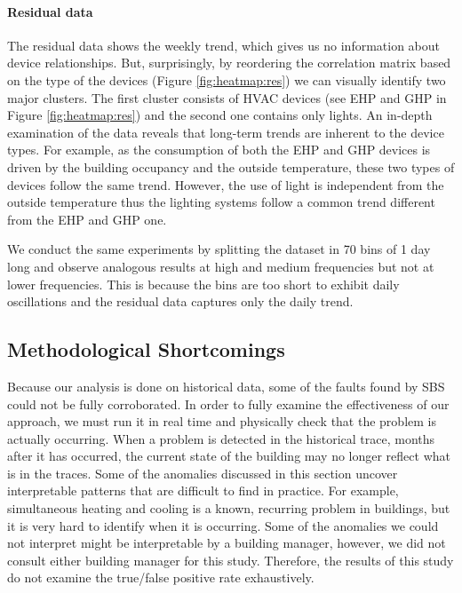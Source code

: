 \paragraph{Residual data}
The residual data shows the weekly trend, which gives us no information about device relationships.
But, surprisingly, by reordering the correlation matrix based on the type of the devices (Figure \ref{fig:heatmap:res}) 
we can visually identify two major clusters.
The first cluster consists of HVAC devices (see EHP and GHP in Figure \ref{fig:heatmap:res}) and the second one contains only lights. 
An in-depth examination of the data reveals that long-term trends are inherent to the device types. 
For example, as the consumption of both the EHP and GHP devices is driven by the building occupancy and the outside temperature, these two types of devices follow the same trend. 
However, the use of light is independent from the outside temperature thus the lighting systems follow a common trend different from the EHP and GHP one.

We conduct the same experiments by splitting the dataset in 70 bins of 1 day long and observe analogous results at high and medium frequencies but not at lower frequencies.  This is because the bins are too short to exhibit daily oscillations and the residual data captures only the daily trend.











\subsection{Methodological Shortcomings}
Because our analysis is done on historical data, some of the faults found by SBS could not be fully
corroborated.  In order to fully examine the effectiveness of our approach, we must run it in real time and
physically check that the problem is actually occurring.  When a problem is detected
in the historical trace, months after it has occurred, the current state of the building may no longer reflect
what is in the traces.  Some of the anomalies discussed in this section uncover interpretable patterns 
that are difficult to find in practice.  For example, simultaneous heating and cooling is a known, recurring problem
 in buildings, but it is very hard to identify  when it is occurring.  Some of the anomalies we could not interpret
might be interpretable by a building manager, however, we did not consult either building manager for this study.
Therefore, the results of this study do not examine the true/false positive rate exhaustively.

